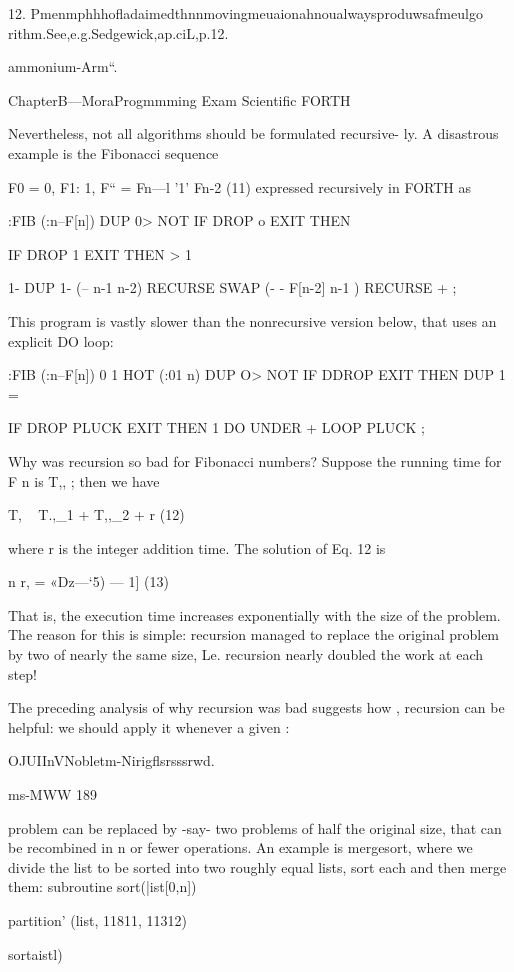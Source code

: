 { 

12. Pmenmphhhoﬂadaimedthnnmovingmeuaionahnoualwaysproduwsafmeulgo
rithm.See,e.g.Sedgewick,ap.ciL,p.12.

ammonium-Arm“.

ChapterB—MoraProgmmming Exam Scientiﬁc FORTH

Nevertheless, not all algorithms should be formulated recursive-
ly. A disastrous example is the Fibonacci sequence

F0 = 0, F1: 1, F“ = Fn—l '1' Fn-2 (11)
expressed recursively in FORTH as

:FIB (:n--F[n])
DUP 0> NOT
IF DROP o EXIT THEN

IF DROP 1 EXIT THEN \n > 1

1- DUP 1- (-- n-1 n-2)
RECURSE SWAP (- - F[n-2] n-1 )
RECURSE + ;

This program is vastly slower than the nonrecursive version
below, that uses an explicit DO loop:

:FIB (:n--F[n])
0 1 HOT (:01 n)
DUP O> NOT
IF DDROP EXIT THEN
DUP 1 =

IF DROP PLUCK EXIT THEN
1 DO UNDER + LOOP PLUCK ;

Why was recursion so bad for Fibonacci numbers? Suppose the
running time for F n is T,, ; then we have

T, ~ T.,_1 + T,,_2 + r (12)

where r is the integer addition time. The solution of Eq. 12 is

n
r, = «Dz—‘5) — 1] (13)

That is, the execution time increases exponentially with the size
of the problem. The reason for this is simple: recursion managed
to replace the original problem by two of nearly the same size, Le.
recursion nearly doubled the work at each step!

The preceding analysis of why recursion was bad suggests how ,
recursion can be helpful: we should apply it whenever a given :

OJUIInVNobletm-Nirigﬂsrsssrwd.

 

ms-MWW 189

problem can be replaced by -say- two problems of half the
original size, that can be recombined in n or fewer operations. An
example is mergesort, where we divide the list to be sorted into
two roughly equal lists, sort each and then merge them:
subroutine sort(|ist[0,n])

partition' (list, 11811, 11312)

sortaistl)

}
